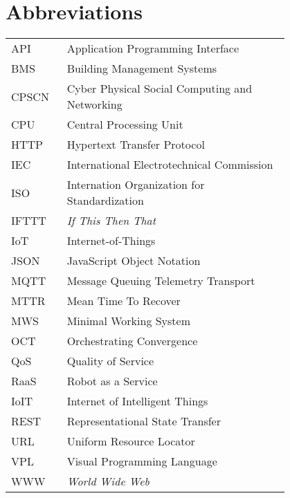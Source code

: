 \chapter*{Abbreviations}


\begin{flushleft}
\begin{tabular}{l p{0.8\linewidth}}
API      & Application Programming Interface\\
BMS      & Building Management Systems\\
CPSCN    & Cyber Physical Social Computing and Networking\\
CPU      & Central Processing Unit\\
HTTP     & Hypertext Transfer Protocol\\
IEC      & International Electrotechnical Commission\\
ISO      & Internation Organization for Standardization\\
IFTTT    & \textit{If This Then That}\\
IoT      & Internet-of-Things\\
JSON     & JavaScript Object Notation\\
MQTT     & Message Queuing Telemetry Transport\\
MTTR     & Mean Time To Recover\\
MWS      & Minimal Working System\\
OCT      & Orchestrating Convergence\\
QoS      & Quality of Service\\
RaaS     & Robot as a Service\\
IoIT     & Internet of Intelligent Things\\
REST     & Representational State Transfer\\
URL      & Uniform Resource Locator\\
VPL      & Visual Programming Language\\
WWW      & \textit{World Wide Web}\\
\end{tabular}
\end{flushleft}

